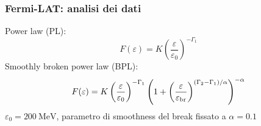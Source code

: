 \documentclass[10pt]{beamer}
\renewcommand{\epsilon}{\varepsilon}
\begin{document}
\begin{frame}
  \frametitle{Fermi-LAT: analisi dei dati}
  Power law (PL):
  \begin{equation*}
    F(\epsilon) = K
    \left(
      \frac{\epsilon}{\epsilon_{0}}
    \right)^{-\Gamma_{1}}
  \end{equation*}
  Smoothly broken power law (BPL):
  \begin{equation*}
    F(\epsilon) = K
    \left(
      \frac{\epsilon}{\epsilon_{0}}
    \right)^{-\Gamma_{1}}
    \left(
      1 +
      \left(
        \frac{\epsilon}{\epsilon_{\textup{br}}}
      \right)^{(\Gamma_{2} - \Gamma_{1})/\alpha}
    \right)^{-\alpha}
  \end{equation*}
  $\epsilon_{0} = \SI{200}{\mega \electronvolt}$, parametro di smoothness del
  break fissato a $\alpha = 0.1$
\end{frame}
\end{document}
